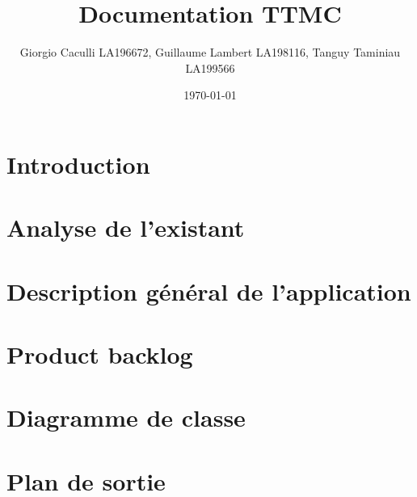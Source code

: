 \documentclass[10pt]{article}
\title{Documentation TTMC}
\author{Giorgio Caculli LA196672, Guillaume Lambert LA198116, Tanguy Taminiau LA199566}
\date{\today}
\begin{document}
\maketitle

\newpage
\tableofcontents

\newpage
\section*{Introduction}
\label{sec:intro}


\newpage
\section{Analyse de l'existant}


\section{Description général de l'application}


\section{Product backlog}


\section{Diagramme de classe}


\section{Plan de sortie}


\newpage
\printglossary
\end{document}
